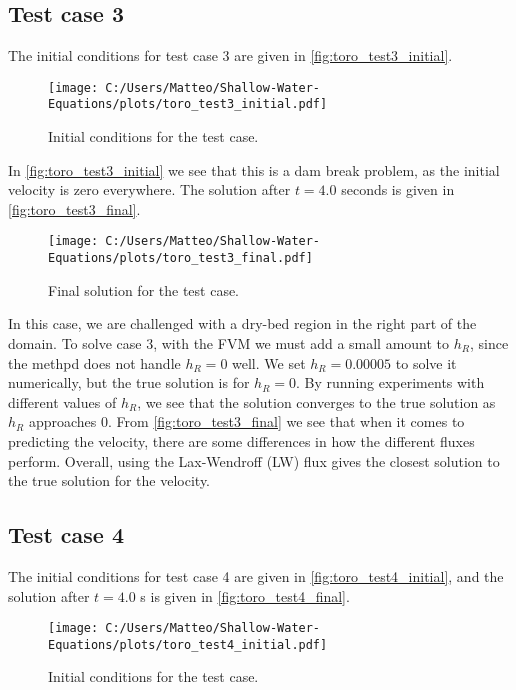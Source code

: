 \newpage
\subsection*{Test case 3}
The initial conditions for test case 3 are given in \autoref{fig:toro_test3_initial}.
\begin{figure}[H]
    \centering
    \texttt{[image: C:/Users/Matteo/Shallow-Water-Equations/plots/toro\_test3\_initial.pdf]}
    \caption{Initial conditions for the test case.}\label{fig:toro_test3_initial}
\end{figure}
In \autoref{fig:toro_test3_initial} we see that this is a dam break problem, as the initial velocity is zero everywhere.
The solution after $t=4.0$ seconds is given in \autoref{fig:toro_test3_final}.
\begin{figure}[H]
    \centering
    \texttt{[image: C:/Users/Matteo/Shallow-Water-Equations/plots/toro\_test3\_final.pdf]}
    \caption{Final solution for the test case.}\label{fig:toro_test3_final}
\end{figure}
In this case, we are challenged with a dry-bed region in the right part of the domain.
To solve case 3, with the FVM we must add a small amount to $h_R$, since the methpd does not handle $h_R = 0$ well.
We set $h_R = 0.00005$ to solve it numerically, but the true solution is for $h_R = 0$.
By running experiments with different values of $h_R$, we see that the solution converges to the true solution as $h_R$ approaches 0.
From \autoref{fig:toro_test3_final} we see that when it comes to predicting the velocity, there are some differences in how the different fluxes perform.
Overall, using the Lax-Wendroff (LW) flux gives the closest solution to the true solution for the velocity.

\newpage
\subsection*{Test case 4}
The initial conditions for test case 4 are given in \autoref{fig:toro_test4_initial}, and the solution after $t=4.0$ s is given in \autoref{fig:toro_test4_final}.
\begin{figure}[H]
    \centering
    \texttt{[image: C:/Users/Matteo/Shallow-Water-Equations/plots/toro\_test4\_initial.pdf]}
    \caption{Initial conditions for the test case.}\label{fig:toro_test4_initial}
\end{figure}

